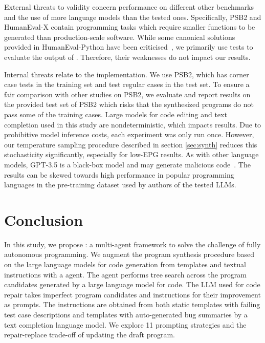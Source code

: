 External threats to validity concern \method{} performance on different other benchmarks and the use of more language models than the tested ones. 
Specifically, PSB2 and HumanEval-X contain programming tasks which require smaller functions to be generated than production-scale software.
While some canonical solutions provided in HumanEval-Python have been criticised~\cite{liuYourCodeGenerated2023}, we primarily use tests to evaluate the output of \method{}. Therefore, their weaknesses do not impact our results.

Internal threats relate to the implementation.
We use PSB2, which has corner case tests in the training set and test regular cases in the test set. 
To ensure a fair comparison with other studies on PSB2, we evaluate and report results on the provided test set of PSB2 which risks that the synthesized programs do not pass some of the training cases. 
Large models for code editing and text completion used in this study are nondeterministic, which impacts results. 
Due to prohibitive model inference costs, each experiment was only run once.
However, our temperature sampling procedure described in section \ref{sec:synth} reduces this stochasticity significantly, especially for low-EPG results.
As with other language models, GPT-3.5 is a black-box model and may generate malicious code~\cite{pearceAsleepKeyboardAssessing2022}. 
The results can be skewed towards high performance in popular programming languages in the pre-training dataset used by authors of the tested LLMs.

\newpage \section{Conclusion}
\label{sec:conclusion}
In this study, we propose \method{}: a multi-agent framework to solve the challenge of fully autonomous programming. 
We augment the program synthesis procedure based on the large language models for code generation from templates and textual instructions with a \debug{} agent. 
The \debug{} agent performs tree search across the program candidates generated by a large language model for code.
The LLM used for code repair takes imperfect program candidates and instructions for their improvement as prompts. 
The instructions are obtained from both static templates with failing test case descriptions and templates with auto-generated bug summaries by a text completion language model. 
We explore 11 prompting strategies and the repair-replace trade-off of updating the draft program.

